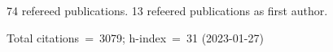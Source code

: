 74 refereed publications. 13 refeered publications as first author.

Total citations~=~3079; h-index~=~31 (2023-01-27)